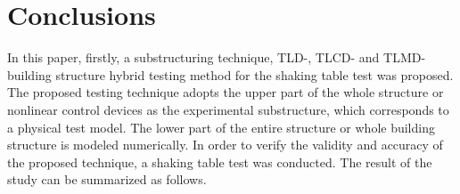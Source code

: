 \chapter{Conclusions}

In this paper, firstly, a substructuring technique, TLD-, TLCD- and TLMD-building structure hybrid testing method for the shaking table test was proposed. The proposed testing technique adopts the upper part of the whole structure or nonlinear control devices as the experimental substructure, which corresponds to a physical test model. The lower part of the entire structure or whole building structure is modeled numerically. In order to verify the validity and accuracy of the proposed technique, a shaking table test was conducted. The result of the study can be summarized as follows.
